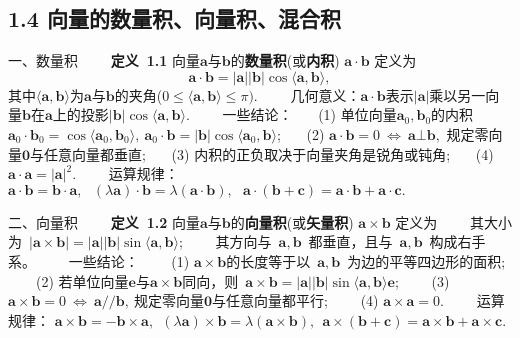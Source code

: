 \documentclass[compress,mathserif,cjk]{beamer}
\theoremstyle{remark}
\numberwithin{equation}{section}
\newcommand{\hei}{\bf}      %
\begin{document}
\begin{CJK}{UTF8}{gbsn}
\section[1.4]{1.4 向量的数量积、向量积、混合积}
\begin{frame}{一、数量积}
 \ \ \ \ {\hei 定义~1.1} 向量$\bm a$与$\bm b$的{\hei 数量积}(或{\hei 内积}) $\bm a\cdot\bm b$ 定义为
 $$\bm a\cdot\bm b=|\bm a||\bm b|\cos\langle\bm a,\bm b\rangle,$$
 其中$\langle\bm a,\bm b\rangle$为$\bm a$与$\bm b$的夹角($0\leq\langle\bm a,\bm b\rangle\leq\pi)$.
 \vskip 10pt
 \ \ \ \ 几何意义：$\bm a\cdot\bm b$表示$|\bm a|$乘以另一向量$\bm b$在$\bm a$上的投影$|\bm b|\cos\langle\bm a,\bm b\rangle$.
 \pause \vskip 5pt
 \ \ \ \ 一些结论：
 \vskip 2pt
 \ \ \ (1) 单位向量$\bm a_0,\bm b_0$的内积$\bm a_0\cdot\bm b_0=\cos\langle\bm a_0,\bm b_0\rangle,~\bm a_0\cdot\bm b=|\bm b|\cos\langle\bm a_0,\bm b\rangle$;
  \vskip 2pt
 \ \ \ (2) $\bm a\cdot\bm b=0~\Longleftrightarrow~\bm a\bot\bm b,$ 规定零向量$\bm 0$与任意向量都垂直;
 \vskip 2pt
 \ \ \ (3) 内积的正负取决于向量夹角是锐角或钝角;
 \vskip 5pt
 \ \ \ (4) $\bm a\cdot\bm a=|\bm a|^2.$
 \vskip 5pt
 \pause\ \ \ \ 运算规律：
  \vskip 2pt
 \ \ \ \ $\bm a\cdot\bm b=\bm b\cdot\bm a,~~~(\lambda\bm a)\cdot\bm b=\lambda(\bm a\cdot\bm b),~~~\bm a\cdot(\bm b+\bm c)=\bm a\cdot\bm b+\bm a\cdot\bm c.$
\end{frame}

\begin{frame}{二、向量积}
 \ \ \ \ {\hei 定义~1.2} 向量$\bm a$与$\bm b$的{\hei 向量积}(或{\hei 矢量积}) $\bm a\times\bm b$ 定义为
 \vskip 5pt
 \ \ \ \ 其大小为~$|\bm a\times\bm b|=|\bm a||\bm b|\sin\langle\bm a,\bm b\rangle$;
 \vskip 5pt
 \ \ \ \ 其方向与~$\bm a,\bm b$~都垂直，且与~$\bm a,\bm b$~构成右手系。
 \pause\vskip 10pt
 \ \ \ \ 一些结论：
 \vskip 5pt
 \ \ \ \ (1) $\bm a\times\bm b$的长度等于以~$\bm a,\bm b$~为边的平等四边形的面积;
 \vskip 5pt
 \ \ \ \ (2) 若单位向量$\bm e$与$\bm a\times\bm b$同向，则~$\bm a\times\bm b=|\bm a||\bm b|\sin\langle\bm a,\bm b\rangle\bm e$;
 \vskip 5pt
 \ \ \ \ (3) $\bm a\times\bm b=0~\Longleftrightarrow~\bm a//\bm b,~$规定零向量$\bm 0$与任意向量都平行;
 \vskip 5pt
 \ \ \ \ (4) $\bm a\times\bm a=0$.
 \vskip 10pt
 \pause\ \ \ \ 运算规律：
 \vskip 5pt
 $\bm a\times\bm b=-\bm b\times\bm a,~~(\lambda\bm a)\times\bm b=\lambda(\bm a\times\bm b),~~\bm a\times(\bm b+\bm c)=\bm a\times\bm b+\bm a\times\bm c.$
\end{frame}


\end{CJK}
\end{document}
